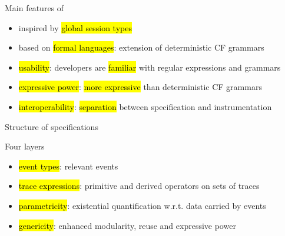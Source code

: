 \documentclass[10pt,usenames,dvipsnames]{beamer}
\begin{document}

\begin{frame}{\rml}

  \begin{block}{Main features of \rml}
    \begin{itemize}
    \item inspired by \hl{global session types}
    \item based on \hl{formal languages}: extension of deterministic CF grammars 
    \item \hl{usability}: developers are \hl{familiar} with regular expressions and grammars
    \item \hl{expressive power}: \hl{more expressive} than deterministic CF grammars
    \item \hl{interoperability}: \hl{separation} between specification and instrumentation
    \end{itemize}
  \end{block}
\end{frame}


\begin{frame}{Structure of \rml specifications}
  \begin{block}{Four layers}
    \begin{itemize}
    \item \hl{event types}: relevant events 
    \item \hl{trace expressions}: primitive and derived operators on sets of traces
    \item \hl{parametricity}: existential quantification w.r.t. data carried by events
    \item \hl{genericity}:  enhanced modularity, reuse and expressive power
    \end{itemize}
  \end{block}
\end{frame}

\end{document}
